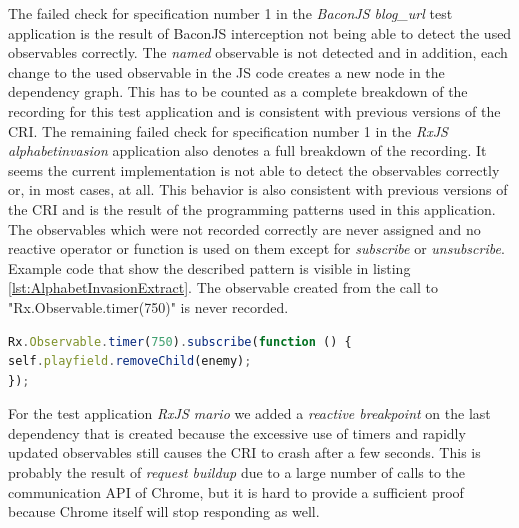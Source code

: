 The failed check for specification number 1 in the \emph{BaconJS blog\_url} test application is the result of BaconJS interception not being able to detect the used observables correctly. The \emph{named} observable is not detected and in addition, each change to the used observable in the JS code creates a new node in the dependency graph. This has to be counted as a complete breakdown of the recording for this test application and is consistent with previous versions of the CRI. The remaining failed check for specification number 1 in the \emph{RxJS alphabetinvasion} application also denotes a full breakdown of the recording. It seems the current implementation is not able to detect the observables correctly or, in most cases, at all. This behavior is also consistent with previous versions of the CRI and is the result of the programming patterns used in this application. The observables which were not recorded correctly are never assigned and no reactive operator or function is used on them except for \emph{subscribe} or \emph{unsubscribe}. Example code that show the described pattern is visible in listing \ref{lst:AlphabetInvasionExtract}. The observable created from the call to "Rx.Observable.timer(750)" is never recorded.

\begin{lstlisting}[language=JavaScript, caption={Extract of RxJS AlphabetInvasion test application.},label={lst:AlphabetInvasionExtract}]
Rx.Observable.timer(750).subscribe(function () {
self.playfield.removeChild(enemy);
});	
\end{lstlisting}

For the test application \emph{RxJS mario} we added a \emph{reactive breakpoint} on the last dependency that is created because the excessive use of timers and rapidly updated observables still causes the CRI to crash after a few seconds. This is probably the result of \emph{request buildup} due to a large number of calls to the communication API of Chrome, but it is hard to provide a sufficient proof because Chrome itself will stop responding as well.

